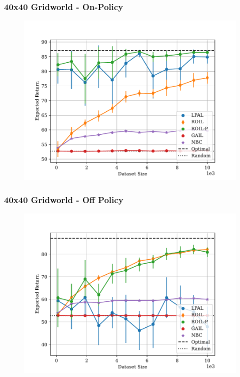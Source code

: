 \documentclass{beamer}
\begin{document}
\begin{frame}
\frametitle{40x40 Gridworld - On-Policy}

\begin{figure}
    \centering
    \includegraphics[width=\linewidth]{plots/returns/40x40_gridworld_on_policy_returns.pdf}
\end{figure}
\end{frame}

\begin{frame}
\frametitle{40x40 Gridworld - Off Policy}
\begin{figure}
    \centering
    \includegraphics[width=\linewidth]{plots/returns/40x40_gridworld_off_policy_returns.pdf}
\end{figure}
\end{frame}
\end{document}

